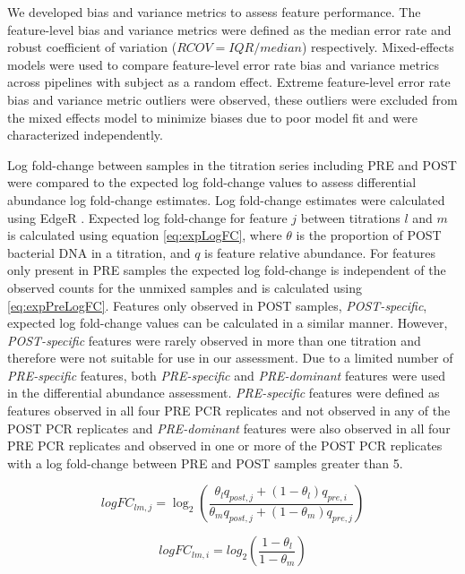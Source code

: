 \documentclass[linenumbers]{bmcart}
\begin{document}
We developed bias and variance metrics to assess feature performance.
The feature-level bias and variance metrics were defined as the median
error rate and robust coefficient of variation (\(RCOV=IQR/median\))
respectively. Mixed-effects models were used to compare feature-level
error rate bias and variance metrics across pipelines with subject as a
random effect. Extreme feature-level error rate bias and variance metric
outliers were observed, these outliers were excluded from the mixed
effects model to minimize biases due to poor model fit and were
characterized independently.

Log fold-change between samples in the titration series including PRE
and POST were compared to the expected log fold-change values to assess
differential abundance log fold-change estimates. Log fold-change
estimates were calculated using EdgeR
\cite{Robinson2010, McCarthy2012}. Expected log fold-change for feature
\(j\) between titrations \(l\) and \(m\) is calculated using equation
\eqref{eq:expLogFC}, where \(\theta\) is the proportion of POST bacterial
DNA in a titration, and \(q\) is feature relative abundance. For
features only present in PRE samples the expected log fold-change is
independent of the observed counts for the unmixed samples and is
calculated using \eqref{eq:expPreLogFC}. Features only observed in POST
samples, \emph{POST-specific}, expected log fold-change values can be
calculated in a similar manner. However, \emph{POST-specific} features
were rarely observed in more than one titration and therefore were not
suitable for use in our assessment. Due to a limited number of
\emph{PRE-specific} features, both \emph{PRE-specific} and
\emph{PRE-dominant} features were used in the differential abundance
assessment. \emph{PRE-specific} features were defined as features
observed in all four PRE PCR replicates and not observed in any of the
POST PCR replicates and \emph{PRE-dominant} features were also observed
in all four PRE PCR replicates and observed in one or more of the POST
PCR replicates with a log fold-change between PRE and POST samples
greater than 5.

\begin{equation}
      logFC_{lm,j} = \log_2\left(\frac{\theta_l q_{post,j} + (1 - \theta_l) q_{pre,i}}{\theta_m q_{post,j} + (1 - \theta_m) q_{pre,j}}\right)
  \label{eq:expLogFC}
\end{equation}

\begin{equation}
      logFC_{lm,i} = log_2\left(\frac{1-\theta_l}{1-\theta_m}\right)
  \label{eq:expPreLogFC}
\end{equation}
\end{document}
